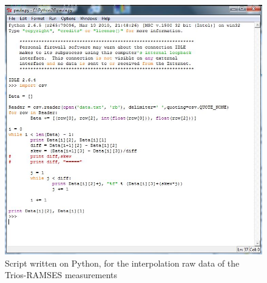 \documentclass[10pt, a4paper]{article}
\begin{document}
\begin{figure}[H]
\centering
\includegraphics[scale=0.30]{Fig-24.jpg}
\caption{Script written on Python, for the interpolation raw data of the Trios-RAMSES measurements}
\label{fig:24}
\end{figure}
\end{document}
